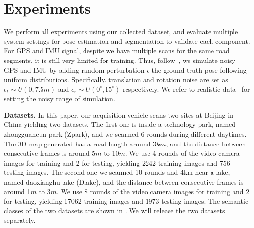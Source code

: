 \vspace{-1.0\baselineskip}
\section{Experiments}
\vspace{-0.4\baselineskip}
\label{sec:experiments}
We perform all experiments using our collected dataset, and evaluate multiple system settings for pose estimation and segmentation to validate each component.
For GPS and IMU signal, despite we have multiple scans for the same road segments, it is still very limited for training. Thus, follow~\cite{vishal2015accurate}, we simulate noisy GPS and IMU by adding random perturbation $\epsilon$ \wrt the ground truth pose following uniform distributions. 
Specifically, translation and rotation noise are set as $\epsilon_t \sim U(0, 7.5m)$ and $\epsilon_r \sim U(0^{\circ}, 15^{\circ})$ respectively. 
We refer to realistic data~\cite{lee2015gps} for setting the noisy range of simulation.

\textbf{Datasets.} In this paper, our acquisition vehicle scans two sites at Beijing in China yielding two datasets. 
The first one is inside a technology park, named zhongguancun park (Zpark), and we scanned 6 rounds during different daytimes. The 3D map generated has a road length around 3$km$, and the distance between consecutive frames is around 5$m$ to 10$m$. We use 4 rounds of the video camera images for training and 2 for testing, yielding 2242 training images and 756 testing images. 
The second one we scanned 10 rounds and 4km near a lake, named daoxianghu lake (Dlake), and the distance between consecutive frames is around 1$m$ to 3$m$. 
We use 8 rounds of the video camera images for training and 2 for testing, yielding 17062 training images and 1973 testing images. 
The semantic classes of the two datasets are shown in . We will release the two datasets separately. %

